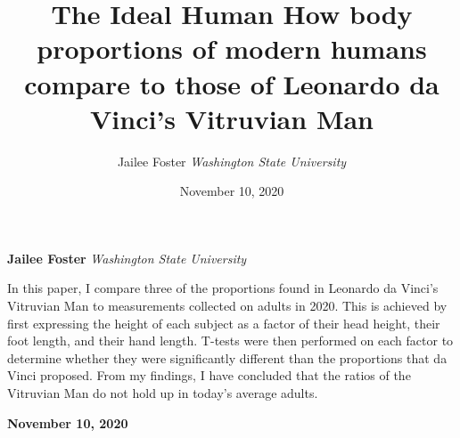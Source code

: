\documentclass[]{article}
\title{\textbf{\textcolor{WSU.crimson}{The Ideal
Human}} \newline \textbf{\textcolor{WSU.gray}{How body proportions of
modern humans compare to those of Leonardo da Vinci's Vitruvian Man}}  }
\author{\Large Jailee
Foster\vspace{0.05in} \newline\normalsize\emph{Washington State
University}  }
\date{November 10, 2020}
\newcommand*{\authorfont}{\fontfamily{phv}\selectfont}
\renewenvironment{abstract}
 {{%
    \setlength{\leftmargin}{0mm}
    \setlength{\rightmargin}{\leftmargin}%
  }%
  \relax}
 {\endlist}
\begin{document}
	
%    


{%
\setlength{\parindent}{0pt}
\thispagestyle{plain}
{\fontsize{18}{20}\selectfont\raggedright 
\maketitle  %

}

{
   \vskip 13.5pt\relax \normalsize\fontsize{11}{12} 
   
\textbf{\authorfont Jailee Foster} \hskip 15pt \emph{\small Washington
State University}   

}

}








\begin{abstract}

    \hbox{\vrule height .2pt width 39.14pc}

    \vskip 8.5pt %

\noindent In this paper, I compare three of the proportions found in
Leonardo da Vinci's Vitruvian Man to measurements collected on adults in
2020. This is achieved by first expressing the height of each subject as
a factor of their head height, their foot length, and their hand length.
T-tests were then performed on each factor to determine whether they
were significantly different than the proportions that da Vinci
proposed. From my findings, I have concluded that the ratios of the
Vitruvian Man do not hold up in today's average adults.


    



    
    \hbox{\vrule height .2pt width 39.14pc}
    \vskip 5pt 
    \hfill \textbf{\textcolor{WSU.gray}{ November 10, 2020 } }
    \vskip 5pt 
    
\end{abstract}


\vskip -8.5pt



\end{document}
